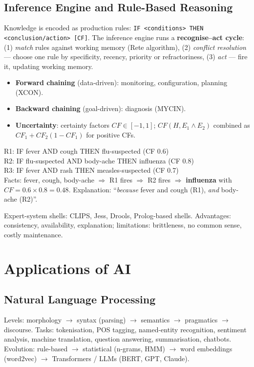 \subsection{Inference Engine and Rule-Based Reasoning}
Knowledge is encoded as production rules: \texttt{IF <conditions> THEN <conclusion/action> [CF]}. The inference engine runs a \textbf{recognise--act cycle}: (1) \emph{match} rules against working memory (Rete algorithm), (2) \emph{conflict resolution} --- choose one rule by specificity, recency, priority or refractoriness, (3) \emph{act} --- fire it, updating working memory.
\begin{itemize}
\item \textbf{Forward chaining} (data-driven): monitoring, configuration, planning (XCON).
\item \textbf{Backward chaining} (goal-driven): diagnosis (MYCIN).
\item \textbf{Uncertainty}: certainty factors $CF\in[-1,1]$; $CF(H,E_1\wedge E_2)$ combined as $CF_1+CF_2(1-CF_1)$ for positive CFs.
\end{itemize}
\begin{example}
\small R1: IF fever AND cough THEN flu-suspected (CF 0.6)\\
R2: IF flu-suspected AND body-ache THEN influenza (CF 0.8)\\
R3: IF fever AND rash THEN measles-suspected (CF 0.7)\\
Facts: fever, cough, body-ache $\Rightarrow$ R1 fires $\Rightarrow$ R2 fires $\Rightarrow$ \textbf{influenza} with $CF=0.6\times0.8=0.48$. Explanation: ``\emph{because} fever and cough (R1), \emph{and} body-ache (R2)''.
\end{example}
Expert-system shells: CLIPS, Jess, Drools, Prolog-based shells. Advantages: consistency, availability, explanation; limitations: brittleness, no common sense, costly maintenance.

\section{Applications of AI}
\subsection{Natural Language Processing}
Levels: morphology $\to$ syntax (parsing) $\to$ semantics $\to$ pragmatics $\to$ discourse. Tasks: tokenisation, POS tagging, named-entity recognition, sentiment analysis, machine translation, question answering, summarisation, chatbots. Evolution: rule-based $\to$ statistical (n-grams, HMM) $\to$ word embeddings (word2vec) $\to$ Transformers / LLMs (BERT, GPT, Claude).
